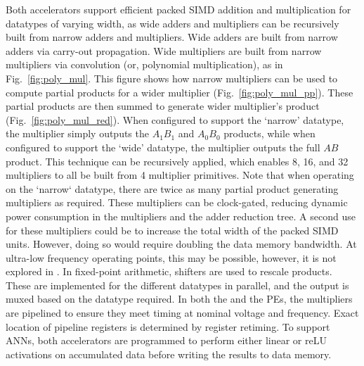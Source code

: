 Both accelerators support efficient packed SIMD addition and multiplication for
datatypes of varying width, as wide adders and multipliers can be
recursively built from narrow adders and multipliers.
Wide adders are built from narrow adders via carry-out propagation.
Wide multipliers are built from narrow multipliers via convolution
(or, polynomial multiplication), as in Fig.~\ref{fig:poly_mul}.
This figure shows how narrow multipliers can be used to compute partial
products for a wider multiplier (Fig.~\ref{fig:poly_mul_pp}).
These partial products are then summed
to generate wider multiplier's product (Fig.~\ref{fig:poly_mul_red}).
When configured to support the `narrow' datatype, the multiplier simply
outputs the \(A_1B_1\) and \(A_0B_0\) products, while when configured
to support the `wide' datatype, the multiplier outputs the full \(AB\)
product.  This technique can be recursively applied, which enables
\SI{8}{\bit}, \SI{16}{\bit}, and \SI{32}{\bit} multipliers to all be built
from \SI{4}{\bit} multiplier primitives.
Note that when operating on the `narrow` datatype, there are twice as many
partial product generating multipliers as required.  These multipliers can
be clock-gated, reducing dynamic power consumption in the multipliers and
the adder reduction tree.  A second use for these multipliers could be to increase
the total width of the packed SIMD units. However, doing so would require
doubling the data memory bandwidth.  At ultra-low frequency operating points,
this may be possible, however, it is not explored in \arch{}.
In fixed-point arithmetic, shifters are used to rescale products.
These are implemented for the different datatypes in parallel, and the output
is muxed based on the datatype required. In both the \vmacc{} and the \cgra{}
PEs, the multipliers are pipelined to ensure they meet timing at nominal
voltage and frequency.  Exact location of pipeline registers is determined by
register retiming.
To support ANNs, both accelerators are programmed to perform either linear or
reLU activations on accumulated data before writing the results to data memory.

